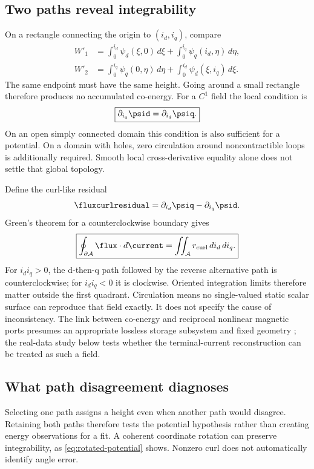 \subsection{Two paths reveal integrability}
On a rectangle connecting the origin to $(i_d,i_q)$, compare
\begin{align}
 W'_1&=\int_0^{i_d}\psi_d(\xi,0)\,d\xi
        +\int_0^{i_q}\psi_q(i_d,\eta)\,d\eta,\\
 W'_2&=\int_0^{i_q}\psi_q(0,\eta)\,d\eta
        +\int_0^{i_d}\psi_d(\xi,i_q)\,d\xi.
\end{align}
The same endpoint must have the same height. Going around a small rectangle
therefore produces no accumulated co-energy. For a $C^1$ field the local
condition is
\begin{equation}
 \boxed{\partial_{i_q}\psid=\partial_{i_d}\psiq.}\label{eq:integrability}
\end{equation}
On an open simply connected domain this condition is also sufficient for a
potential. On a domain with holes, zero circulation around noncontractible
loops is additionally required. Smooth local cross-derivative equality alone
does not settle that global topology.

Define the curl-like residual
\begin{equation}
\fluxcurlresidual=\partial_{i_d}\psiq-\partial_{i_q}\psid.
\end{equation}
Green's theorem for a counterclockwise boundary gives
\begin{equation}
 \boxed{\oint_{\partial\mathcal A}\flux\cdot d\current
        =\iint_{\mathcal A}r_{\rm curl}\,di_d\,di_q.}
 \label{eq:green}
\end{equation}
For $i_di_q>0$, the d-then-q path followed by the reverse alternative
path is counterclockwise; for $i_di_q<0$ it is clockwise. Oriented integration
limits therefore matter outside the first quadrant. Circulation means no
single-valued static scalar surface can
reproduce that field exactly. It does not specify the cause of inconsistency.
The link between co-energy and reciprocal nonlinear magnetic ports presumes
an appropriate lossless storage subsystem and fixed geometry
\cite[Sec.~11.7]{haus1989}; the real-data study below tests whether the
terminal-current reconstruction can be treated as such a field.


\subsection{What path disagreement diagnoses}
Selecting one path assigns a height even when another path would disagree.
Retaining both paths therefore tests the potential hypothesis rather than
creating energy observations for a fit. A coherent coordinate rotation can
preserve integrability, as \cref{eq:rotated-potential} shows. Nonzero curl
does not automatically identify angle error.

